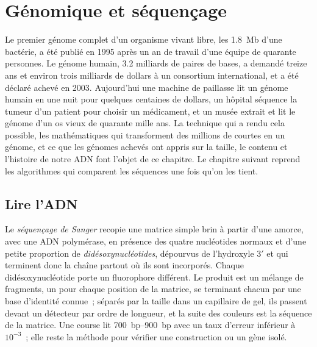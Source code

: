 \chapter{Génomique et séquençage}\label{ch:b3:genomics}

Le premier génome complet d'un organisme vivant libre, les \qty{1.8}{Mb}
d'une bactérie, a été publié en 1995 après un an de travail d'une équipe
de quarante personnes. Le génome humain, \num{3.2} milliards de paires
de bases, a demandé treize ans et environ trois milliards de dollars à
un consortium international, et a été déclaré achevé en 2003.
Aujourd'hui une machine de paillasse lit un génome humain en une nuit
pour quelques centaines de dollars, un hôpital séquence la tumeur d'un
patient pour choisir un médicament, et un musée extrait et lit le génome
d'un os vieux de quarante mille ans. La technique qui a rendu cela
possible, les mathématiques qui transforment des millions de 
courtes en un génome, et ce que les génomes achevés ont appris sur la
taille, le contenu et l'histoire de notre ADN font l'objet de ce
chapitre. Le chapitre suivant reprend les algorithmes qui comparent les
séquences une fois qu'on les tient.

\section{Lire l'ADN}

\begin{definition}\label{def:b3:genomics:sanger}
Le \emph{séquençage de Sanger} recopie une matrice simple brin à partir
d'une amorce, avec une ADN polymérase, en présence des quatre
nucléotides normaux et d'une petite proportion de
\emph{didésoxynucléotides}, dépourvus de l'hydroxyle 3$'$ et qui
terminent donc la chaîne partout où ils sont incorporés. Chaque
didésoxynucléotide porte un fluorophore différent. Le produit est un
mélange de fragments, un pour chaque position de la matrice, se
terminant chacun par une base d'identité connue~; séparés par la taille
dans un capillaire de gel, ils passent devant un détecteur par ordre de
longueur, et la suite des couleurs est la séquence de la matrice. Une
course lit \qtyrange{700}{900}{bp} avec un taux d'erreur inférieur à
$10^{-3}$~; elle reste la méthode pour vérifier une construction ou un
gène isolé.
\end{definition}

